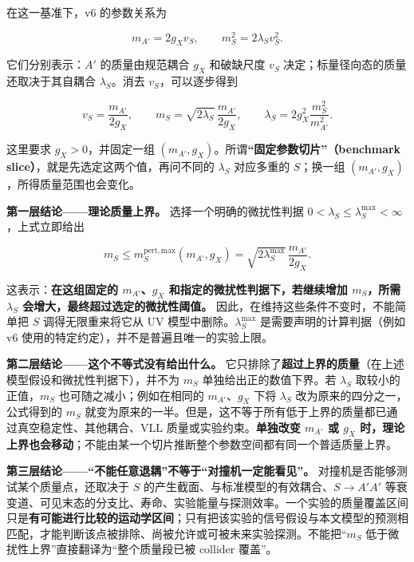 \documentclass[
  chinese,
  UTF8]{ctexart}
\begin{document}
在这一基准下，v6 的参数关系为

\[
 m_{A'}=2g_Xv_S,\qquad m_S^2=2\lambda_Sv_S^2.
\]

它们分别表示：\(A'\) 的质量由规范耦合 \(g_X\) 和破缺尺度 \(v_S\)
决定；标量径向态的质量还取决于其自耦合 \(\lambda_S\)。消去
\(v_S\)，可以逐步得到

\[
 v_S=\frac{m_{A'}}{2g_X},\qquad
 m_S=\sqrt{2\lambda_S}\,\frac{m_{A'}}{2g_X},\qquad
 \lambda_S=2g_X^2\frac{m_S^2}{m_{A'}^2}.
\]

这里要求 \(g_X>0\)，并固定一组
\((m_{A'},g_X)\)。所谓\textbf{``固定参数切片''（benchmark
slice）}，就是先选定这两个值，再问不同的 \(\lambda_S\) 对应多重的
\(S\)；换一组 \((m_{A'},g_X)\)，所得质量范围也会变化。

\textbf{第一层结论------理论质量上界。} 选择一个明确的微扰性判据
\(0<\lambda_S\leq\lambda_S^{\max}<\infty\)，上式立即给出

\[
 \boxed{m_S\leq m_S^{\mathrm{pert,max}}(m_{A'},g_X)
 =\sqrt{2\lambda_S^{\max}}\,\frac{m_{A'}}{2g_X}}.
\]

这表示：\textbf{在这组固定的 \(m_{A'}\)、\(g_X\)
和指定的微扰性判据下，若继续增加 \(m_S\)，所需 \(\lambda_S\)
会增大，最终超过选定的微扰性阈值。}
因此，在维持这些条件不变时，不能简单把 \(S\) 调得无限重来将它从 UV
模型中删除。\(\lambda_S^{\max}\) 是需要声明的计算判据（例如 v6
使用的特定约定），并不是普遍且唯一的实验上限。

\textbf{第二层结论------这个不等式没有给出什么。}
它只排除了\textbf{超过上界的质量}（在上述模型假设和微扰性判据下），并不为
\(m_S\) 单独给出正的数值下界。若 \(\lambda_S\) 取较小的正值，\(m_S\)
也可随之减小；例如在相同的 \(m_{A'}\)、\(g_X\) 下将 \(\lambda_S\)
改为原来的四分之一，公式得到的 \(m_S\)
就变为原来的一半。但是，这不等于所有低于上界的质量都已通过真空稳定性、其他耦合、VLL
质量或实验约束。\textbf{单独改变 \(m_{A'}\) 或 \(g_X\)
时，理论上界也会移动}；不能由某一个切片推断整个参数空间都有同一个普适质量上界。

\textbf{第三层结论------``不能任意退耦''不等于``对撞机一定能看见''。}
对撞机是否能够测试某个质量点，还取决于 \(S\)
的产生截面、与标准模型的有效耦合、\(S\to A'A'\)
等衰变道、可见末态的分支比、寿命、实验能量与探测效率。一个实验的质量覆盖区间只是\textbf{有可能进行比较的运动学区间}；只有把该实验的信号假设与本文模型的预测相匹配，才能判断该点被排除、尚被允许或可被未来实验探测。不能把``\(m_S\)
低于微扰性上界''直接翻译为``整个质量段已被 collider 覆盖''。
\end{document}
